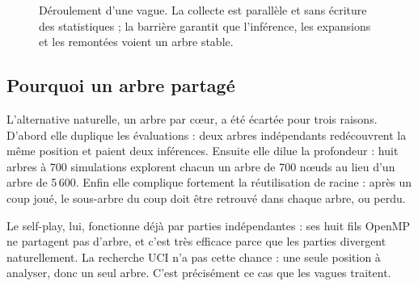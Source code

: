 \begin{figure}[t]
\centering
{}
\caption{D\'eroulement d'une vague. La collecte est parall\`ele et sans
\'ecriture des statistiques ; la barri\`ere garantit que l'inf\'erence, les
expansions et les remont\'ees voient un arbre stable.}
\label{fig:vague}
\end{figure}

\subsection{Pourquoi un arbre partag\'e}

L'alternative naturelle, un arbre par c\oe{}ur, a \'et\'e \'ecart\'ee pour
trois raisons. D'abord elle duplique les \'evaluations : deux arbres
ind\'ependants red\'ecouvrent la m\^eme position et paient deux inf\'erences.
Ensuite elle dilue la profondeur : huit arbres \`a 700 simulations explorent
chacun un arbre de 700 n\oe{}uds au lieu d'un arbre de 5\,600. Enfin elle
complique fortement la r\'eutilisation de racine : apr\`es un coup jou\'e, le
sous-arbre du coup doit \^etre retrouv\'e dans chaque arbre, ou perdu.

Le self-play, lui, fonctionne d\'ej\`a par parties ind\'ependantes : ses huit
fils OpenMP ne partagent pas d'arbre, et c'est tr\`es efficace parce que les
parties divergent naturellement. La recherche UCI n'a pas cette chance : une
seule position \`a analyser, donc un seul arbre. C'est pr\'ecis\'ement ce cas
que les vagues traitent.

